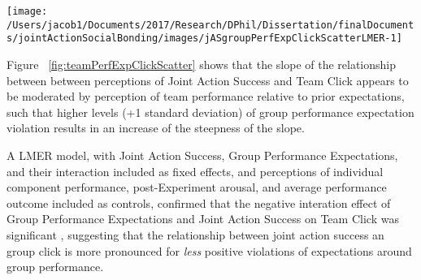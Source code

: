 \documentclass[english]{article}\usepackage[]{graphicx}\usepackage[]{color}
\makeatletter
\def\maxwidth{ %
  \ifdim\Gin@nat@width>\linewidth
    \linewidth
  \else
    \Gin@nat@width
  \fi
}
\newenvironment{kframe}{%
 \def\at@end@of@kframe{}%
 \ifinner\ifhmode%
  \def\at@end@of@kframe{\end{minipage}}%
  \begin{minipage}{\columnwidth}%
 \fi\fi%
 \def\FrameCommand##1{\hskip\@totalleftmargin \hskip-\fboxsep
 \colorbox{shadecolor}{##1}\hskip-\fboxsep
     \hskip-\linewidth \hskip-\@totalleftmargin \hskip\columnwidth}%
 \MakeFramed {\advance\hsize-\width
   \@totalleftmargin\z@ \linewidth\hsize
   \@setminipage}}%
 {\par\unskip\endMakeFramed%
 \at@end@of@kframe}
\newenvironment{knitrout}{}{} %
\makeatother
\begin{document}
\begin{knitrout}
\color{fgcolor}\begin{kframe}


{\ttfamily\noindent\itshape\color{messagecolor}{\#\# Saving 3.5 x 3.5 in image}}

{\ttfamily\noindent\color{warningcolor}{\#\# Warning: Removed 1 rows containing missing values (geom\_point).}}

{\ttfamily\noindent\color{warningcolor}{\#\# Warning: Removed 1 rows containing missing values (geom\_point).}}\end{kframe}

{\centering \texttt{[image: /Users/jacob1/Documents/2017/Research/DPhil/Dissertation/finalDocuments/jointActionSocialBonding/images/jASgroupPerfExpClickScatterLMER-1]} 

}



\end{knitrout}

Figure ~\ref{fig:teamPerfExpClickScatter} shows that the slope of the relationship between between perceptions of Joint Action Success and Team Click appears to be  moderated by perception of team performance relative to prior expectations, such that higher levels (+1 standard deviation) of group performance expectation violation results in an increase of the steepness of the slope.


A LMER model, with Joint Action Success, Group Performance Expectations, and their interaction included as fixed effects, and perceptions of individual component performance, post-Experiment arousal, and average performance outcome included as controls, confirmed that the negative interation effect of Group Performance Expectations and Joint Action Success on Team Click was significant
,
suggesting that the relationship between joint action success an group click is more pronounced for \textit{less} positive violations of expectations around group performance.


\end{document}
